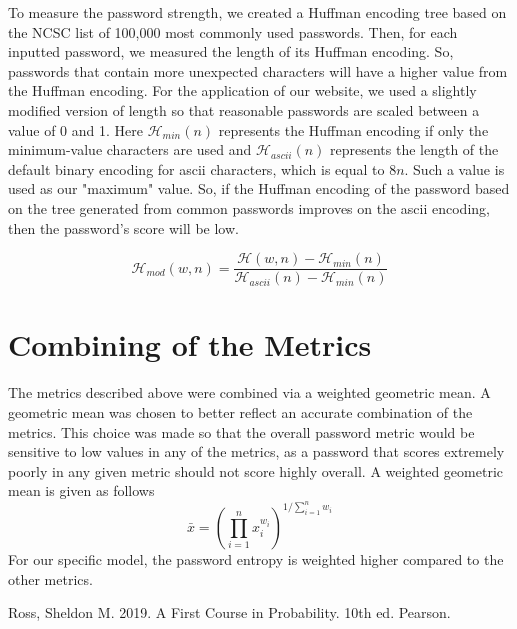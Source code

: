 \documentclass{article}
\begin{document}
To measure the password strength, we created a Huffman encoding tree based on the NCSC list of 100,000 most commonly used passwords. Then, for each inputted password, we measured the length of its Huffman encoding. So, passwords that contain more unexpected characters will have a higher value from the Huffman encoding.
For the application of our website, we used a slightly modified version of length so that reasonable passwords are scaled between a value of 0 and 1. Here $\mathcal{H}_{min}(n)$ represents the Huffman encoding if only the minimum-value characters are used and $\mathcal{H}_{ascii}(n)$ represents the length of the default binary encoding for ascii characters, which is equal to $8n$. Such a value is used as our "maximum" value. So, if the Huffman encoding of the password based on the tree generated from common passwords improves on the ascii encoding, then the password's score will be low.

\[\mathcal{H}_{mod}(w,n)=\frac{\mathcal{H}(w,n)-\mathcal{H}_{min}(n)}{\mathcal{H}_{ascii}(n)-\mathcal{H}_{min}(n)}\]

\section{Combining of the Metrics}
The metrics described above were combined via a weighted geometric mean. A geometric mean was chosen to better reflect an accurate combination of the metrics. 
This choice was made so that the overall password metric would be sensitive to low values in any of the metrics, as a password that scores extremely poorly in any given metric should not score highly overall.
A weighted geometric mean is given as follows
\[
\bar{x} = \left(\prod_{i=1}^{n} x_i^{w_i}\right)^{1/\sum_{i=1}^n w_i}
\]
For our specific model, the password entropy is weighted higher compared to the other metrics.

\newpage
\begin{thebibliography}{00}
 Ross, Sheldon M. 2019. A First Course in Probability. 10th ed. Pearson.
\end{thebibliography}
\end{document}
